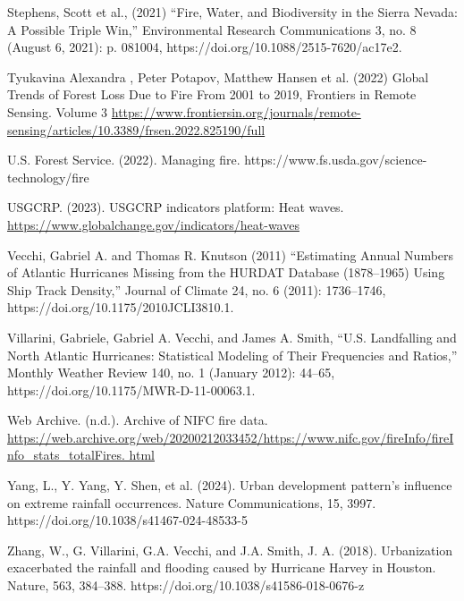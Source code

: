 \documentclass[12pt,paper=a4,DIV=12,parskip=never,chapterprefix=false,headings=standardclasses]{scrreprt}
\begin{document}
Stephens, Scott et al., (2021) “Fire, Water, and Biodiversity in the Sierra Nevada: A Possible Triple Win,”
Environmental Research Communications 3, no. 8 (August 6, 2021): p. 081004,
https://doi.org/10.1088/2515-7620/ac17e2.

Tyukavina Alexandra , Peter Potapov, Matthew Hansen et al. (2022) Global Trends of Forest Loss Due to
Fire From 2001 to 2019, Frontiers in Remote Sensing. Volume 3
\url{https://www.frontiersin.org/journals/remote-sensing/articles/10.3389/frsen.2022.825190/full}

U.S. Forest Service. (2022). Managing fire. https://www.fs.usda.gov/science-technology/fire

USGCRP. (2023). USGCRP indicators platform: Heat waves.
\url{https://www.globalchange.gov/indicators/heat-waves}

Vecchi, Gabriel A. and Thomas R. Knutson (2011) “Estimating Annual Numbers of Atlantic Hurricanes
Missing from the HURDAT Database (1878–1965) Using Ship Track Density,” Journal of Climate
24, no. 6 (2011): 1736–1746, https://doi.org/10.1175/2010JCLI3810.1.

Villarini, Gabriele, Gabriel A. Vecchi, and James A. Smith, “U.S. Landfalling and North Atlantic
Hurricanes: Statistical Modeling of Their Frequencies and Ratios,” Monthly Weather Review 140, no.
1 (January 2012): 44–65, https://doi.org/10.1175/MWR-D-11-00063.1.

Web Archive. (n.d.). Archive of NIFC fire data.
\url{https://web.archive.org/web/20200212033452/https://www.nifc.gov/fireInfo/fireInfo_stats_totalFires.
html}

Yang, L., Y. Yang, Y. Shen, et al. (2024). Urban development pattern’s influence on extreme rainfall
occurrences. Nature Communications, 15, 3997. https://doi.org/10.1038/s41467-024-48533-5

Zhang, W., G. Villarini, G.A. Vecchi, and J.A. Smith, J. A. (2018). Urbanization exacerbated the rainfall
and flooding caused by Hurricane Harvey in Houston. Nature, 563, 384–388.
https://doi.org/10.1038/s41586-018-0676-z
\endgroup


\end{document}
